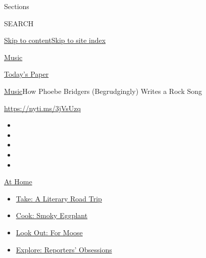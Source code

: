 Sections

SEARCH

\protect\hyperlink{site-content}{Skip to
content}\protect\hyperlink{site-index}{Skip to site index}

\href{https://www.nytimes3xbfgragh.onion/section/arts/music}{Music}

\href{https://myaccount.nytimes3xbfgragh.onion/auth/login?response_type=cookie\&client_id=vi}{}

\href{https://www.nytimes3xbfgragh.onion/section/todayspaper}{Today's
Paper}

\href{/section/arts/music}{Music}\textbar{}How Phoebe Bridgers
(Begrudgingly) Writes a Rock Song

\url{https://nyti.ms/3jVsUzq}

\begin{itemize}
\item
\item
\item
\item
\item
\end{itemize}

\href{https://www.nytimes3xbfgragh.onion/spotlight/at-home?action=click\&pgtype=Article\&state=default\&region=TOP_BANNER\&context=at_home_menu}{At
Home}

\begin{itemize}
\tightlist
\item
  \href{https://www.nytimes3xbfgragh.onion/2020/07/28/books/time-for-a-literary-road-trip.html?action=click\&pgtype=Article\&state=default\&region=TOP_BANNER\&context=at_home_menu}{Take:
  A Literary Road Trip}
\item
  \href{https://www.nytimes3xbfgragh.onion/2020/07/29/magazine/bored-with-your-home-cooking-some-smoky-eggplant-will-fix-that.html?action=click\&pgtype=Article\&state=default\&region=TOP_BANNER\&context=at_home_menu}{Cook:
  Smoky Eggplant}
\item
  \href{https://www.nytimes3xbfgragh.onion/2020/07/27/travel/moose-michigan-isle-royale.html?action=click\&pgtype=Article\&state=default\&region=TOP_BANNER\&context=at_home_menu}{Look
  Out: For Moose}
\item
  \href{https://www.nytimes3xbfgragh.onion/interactive/2020/at-home/even-more-reporters-editors-diaries-lists-recommendations.html?action=click\&pgtype=Article\&state=default\&region=TOP_BANNER\&context=at_home_menu}{Explore:
  Reporters' Obsessions}
\end{itemize}

